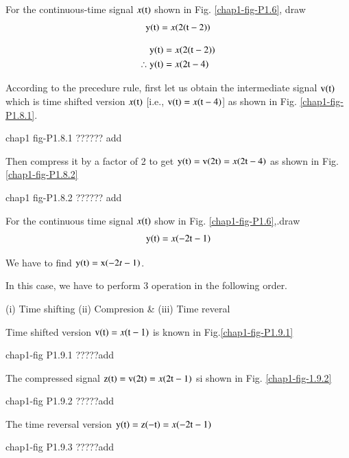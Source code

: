 \begin{example}
For the continuous-time signal $x(\textrm{t})$ shown in Fig. \ref{chap1-fig-P1.6}, draw
$$
\textrm{y}(\textrm{t}) =x(2(\textrm{t}-2))
$$
\end{example}
\begin{solution}
\begin{align*}
{\textrm{y}(\textrm{t})} &=  x(2(\textrm{t}-2))\\
\therefore {\textrm{y}(\textrm{t})} &= x (2\textrm{t}-4)
\end{align*}

According to the precedure rule, first let us obtain the intermediate signal $\textrm{v}(\textrm{t})$ which is time shifted version $x(\textrm{t})$ [i.e., ${\textrm{v}(\textrm{t})}=x(\textrm{t}-4)$] as shown in Fig. \ref{chap1-fig-P1.8.1}.
\begin{center}
chap1 fig-P1.8.1 ?????? add
\end{center}

Then compress it by a factor of 2 to get ${\textrm{y}(\textrm{t})} = {\textrm{v}}(2{\textrm{t}}) = x(2\textrm{t} -4)$ as shown in
Fig. \ref{chap1-fig-P1.8.2}

\begin{center}
chap1 fig-P1.8.2 ?????? add
\end{center}
\end{solution}

\begin{example}\label{chap1-example-1.9}
For the continuous time signal $x(\textrm{t})$ show in Fig. \ref{chap1-fig-P1.6},.draw
$$
{\textrm{y}(\textrm{t})} =x(-2\textrm{t} -1) 
$$
\end{example}

\begin{solution}
We have to find $\textrm{y}(\textrm{t}) =\textrm{x}(-2t-1)$.

In this case, we have to perform 3 operation in the following order.

(i) Time shifting  (ii) Compresion \& (iii) Time reveral

Time shifted version ${\textrm{v}(\textrm{t})} = x(\textrm{t}-1)$ is known in Fig.\ref{chap1-fig-P1.9.1}
\begin{center}
chap1-fig P1.9.1 ?????add
\end{center}

The compressed signal ${\textrm{z}(\textrm{t})} = {\textrm{v}(2 \textrm{t})} = x(2 \textrm{t}-1)$ si shown in Fig. \ref{chap1-fig-1.9.2} 

\begin{center}
chap1-fig P1.9.2 ?????add
\end{center}

The time reversal version ${\textrm{y}(\textrm{t})} = {\textrm{z}(-\textrm{t})} = x(-2\textrm{t}-1)$

\begin{center}
chap1-fig P1.9.3 ?????add
\end{center}
\end{solution}

